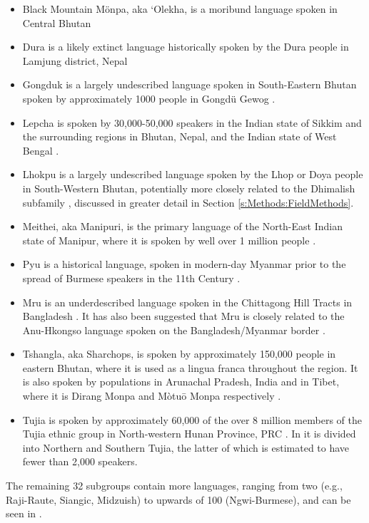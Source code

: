 {\begin{itemize}
    \item Black Mountain Mönpa, aka `Olekha, is a moribund language spoken in Central Bhutan \cite{Hyslop2016}
    \item Dura is a likely extinct language historically spoken by the Dura people in Lamjung district, Nepal \cite{Schorer2016}
    \item Gongduk is a largely undescribed language spoken in South-Eastern Bhutan spoken by approximately 1000 people in Gongdü Gewog \cite{Bodt2012}.
    \item Lepcha is spoken by 30,000-50,000 speakers in the Indian state of Sikkim and the surrounding regions in Bhutan, Nepal, and the Indian state of West Bengal \cite{Plaisier2007}.
    \item Lhokpu is a largely undescribed language spoken by the Lhop or Doya people in South-Western Bhutan, potentially more closely related to the Dhimalish subfamily \cites{Bodt2012}{Grollmann2018}, discussed in greater detail in Section \ref{s:Methods:FieldMethods}.
    \item Meithei, aka Manipuri, is the primary language of the North-East Indian state of Manipur, where it is spoken by well over 1 million people \cite{Chelliah1997}.
    \item Pyu is a historical language, spoken in modern-day Myanmar prior to the spread of Burmese speakers in the 11th Century \cite{Miyake2019}.
    \item Mru is an underdescribed language spoken in the Chittagong Hill Tracts in Bangladesh \cite{VanDriem2014}. It has also been suggested that Mru is closely related to the Anu-Hkongso language spoken on the Bangladesh/Myanmar border \cite{Peterson2017}.
    \item Tshangla, aka Sharchops, is spoken by approximately 150,000 people in eastern Bhutan, where it is used as a lingua franca throughout the region. It is also spoken by populations in Arunachal Pradesh, India and in Tibet, where it is Dirang Monpa and Mòtuō Monpa respectively \cite{Andvik2010}.
    \item Tujia is spoken by approximately 60,000 of the over 8 million members of the Tujia ethnic group in North-western Hunan Province, PRC \cite{Brassett2006}. In  it is divided into Northern and Southern Tujia, the latter of which is estimated to have fewer than 2,000 speakers.
\end{itemize}

The remaining 32 subgroups contain more languages, ranging from two (e.g., Raji-Raute, Siangic, Midzuish) to upwards of 100 (Ngwi-Burmese), and can be seen in .

}

